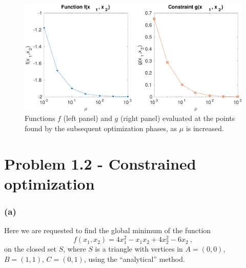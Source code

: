 \documentclass[12pt,titlepage]{article}
\begin{document}
\begin{figure}[H]
\centering
\includegraphics[width=\textwidth]{../Figures/fig11.pdf}
\caption{Functions $f$ (left panel) and $g$ (right panel) evaluated at the points found by the subsequent optimization phases, as $\mu$ is increased.}
\label{fig::11}
\end{figure}


\section*{Problem 1.2 - Constrained optimization}

\subsubsection*{(a)}
Here we are requested to find the global minimum of the function
\begin{equation}
f(x_1, x_2) = 4x_1^2 - x_1 x_2 + 4x_2^2 -6x_2 \ ,
\end{equation}
on the closed set $S$, where $S$ is a triangle with vertices in $A = (0,0)$, $B = (1,1)$, $C = (0,1)$, using the  ``analytical'' method.
\end{document}
